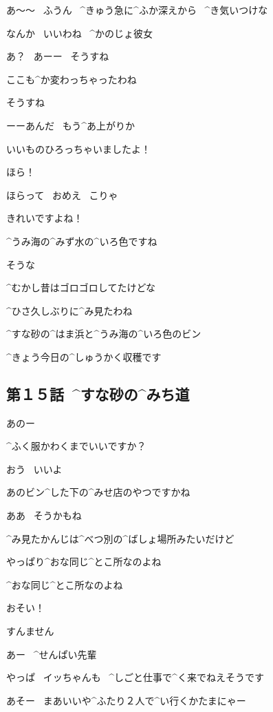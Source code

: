 \Ojisan あ〜〜
\ ふうん
\ ^{きゅう}{急}に^{ふか}{深}えから
\ ^{き}{気}いつけな

\page[106]
\Sensei なんか
\ いいわね
\ ^{かのじょ}{彼女}

\Ojisan あ？
\ あーー
\ そうすね

\Sensei ここも^{か}{変}わっちゃったわね

\Ojisan そうすね

\page
\Ojisan ーーあんだ
\ もう^{あ}{上}がりか

\Alpha いいものひろっちゃいましたよ！

\Alpha ほら！

\Ojisan ほらって
\ おめえ
\ こりゃ

\Alpha きれいですよね！

\Alpha ^{うみ}{海}の^{みず}{水}の^{いろ}{色}ですね

\page
\Ojisan そうな

\Ojisan ^{むかし}{昔}はゴロゴロしてたけどな

\Sensei ^{ひさ}{久}しぶりに^{み}{見}たわね

\Alpha ^{すな}{砂}の^{はま}{浜}と^{うみ}{海}の^{いろ}{色}のビン

\Alpha ^{きょう}{今日}の^{しゅうかく}{収穫}です


\subsection{第１５話\ ^{すな}{砂}の^{みち}{道}}

\page[110]
\Alpha あのー

\Alpha ^{ふく}{服}かわくまでいいですか？

\Ojisan おう
\ いいよ

\page
\Ojisan あのビン^{した}{下}の^{みせ}{店}のやつですかね

\Sensei ああ
\ そうかもね

\Sensei ^{み}{見}たかんじは^{べつ}{別}の^{ばしょ}{場所}みたいだけど

\Sensei やっぱり^{おな}{同}じ^{とこ}{所}なのよね

\page
\Sensei ^{おな}{同}じ^{とこ}{所}なのよね

\page[114]
\Sensei おそい！

\Ojisan すんません

\Ojisan あー
\ ^{せんぱい}{先輩}

\Ojisan やっぱ
\ イッちゃんも
\ ^{しごと}{仕事}で^{く}{来}でねえそうです

\Sensei あそー
\ まあいいや^{ふたり}{２人}で^{い}{行}くかたまにゃー

